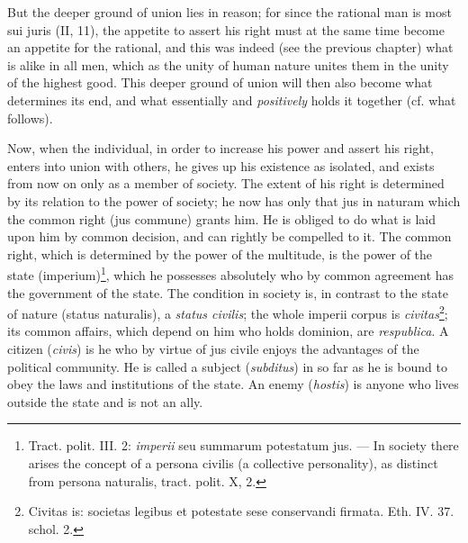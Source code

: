 \documentclass[12pt,a4paper,openany]{book}
\newcommand{\opage}[1]{\marginnote{\footnotesize\textit{[#1]}}}
\begin{document}
\opage{137}\setcounter{footnote}{0}But the deeper ground of union lies in reason; for since the rational man is most sui juris (II, 11), the appetite to assert his right must at the same time become an appetite for the rational, and this was indeed (see the previous chapter) what is alike in all men, which as the unity of human nature unites them in the unity of the highest good. This deeper ground of union will then also become what determines its end, and what essentially and \emph{positively} holds it together (cf. what follows).

Now, when the individual, in order to increase his power and assert his right, enters into union with others, he gives up his existence as isolated, and exists from now on only as a member of society. The extent of his right is determined by its relation to the power of society; he now has only that jus in naturam which the common right (jus commune) grants him. He is obliged to do what is laid upon him by common decision, and can rightly be compelled to it. The common right, which is determined by the power of the multitude, is the power of the state (imperium)\footnote{Tract. polit. III. 2: \emph{imperii} seu summarum potestatum jus. --- In society there arises the concept of a persona civilis (a collective personality), as distinct from persona naturalis, tract. polit. X, 2.}, which he possesses absolutely who by common agreement has the government of the state. The condition in society is, in contrast to the state of nature (status naturalis), a \emph{status civilis}; the whole imperii corpus is \emph{civitas}\footnote{Civitas is: societas legibus et potestate sese conservandi firmata. Eth. IV. 37. schol. 2.}; its common affairs, which depend on him who holds dominion, are \emph{respublica}. A citizen (\emph{civis}) is he who by virtue of jus civile enjoys the advantages of the political community. He is called a subject (\emph{subditus}) in so far as he is bound to obey the laws and institutions of the state. An enemy (\emph{hostis}) is anyone who lives outside the state and is not an ally.
\end{document}
